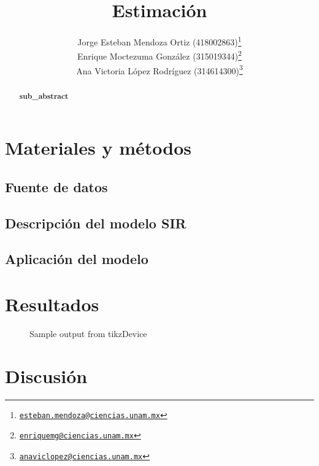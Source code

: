 \documentclass[12pt]{article}
\newcommand{\absdiv}[1]{%
  \par\addvspace{.5\baselineskip}%
  \noindent\textbf{#1}\quad\ignorespaces
}
\begin{document}
	\title{Estimación}
	\author{Jorge Esteban Mendoza Ortiz (418002863)\thanks{\href{mailto:esteban.mendoza@ciencias.unam.mx}{\nolinkurl{esteban.mendoza@ciencias.unam.mx}}} \\
	Enrique Moctezuma González (315019344)\thanks{\href{mailto:enriquemg@ciencias.unam.mx}{\nolinkurl{enriquemg@ciencias.unam.mx}}}\\
	Ana Victoria López Rodríguez (314614300)\thanks{\href{anaviclopez@ciencias.unam.mx}{\nolinkurl{anaviclopez@ciencias.unam.mx}}}}
	\date{}
	\maketitle
	
	\begin{abstract}
	\absdiv{sub\_abstract}
	\end{abstract}
	
	\noindent
	
	\section{Materiales y métodos}
	\subsection*{Fuente de datos}
	
	\subsection*{Descripción del modelo SIR}
	
	\subsection*{Aplicación del modelo}
	
	\section{Resultados}
	
	\begin{figure}
		\centering
		
		\caption{Sample output from tikzDevice}
		\label{plot:test}
	\end{figure}
	
	\section{Discusión}
	
	
	
\end{document}
